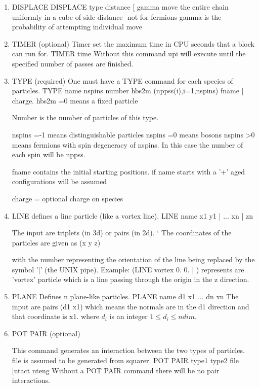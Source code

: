 \begin{enumerate}
\item DISPLACE
\bv
 DISPLACE  type distance [ gamma 
\ev
  move the entire chain uniformly in a cube
  of  side distance -not for fermions
  gamma is the probability of attempting individual  move
\item TIMER (optional)
Timer set the maximum time in CPU seconds that a block can run for.
\bv
TIMER  time
\ev
Without this command upi will execute until the specified number of
passes are finished.
         
\item TYPE (required)
One must have a TYPE command for each species of particles.
\bv
TYPE name nspins number hbs2m (nppss(i),i=1,nspins) fname [ charge.
\ev
     hbs2m =0 means a fixed particle

Number is the number of particles of this type.

     nspins =-1 means distinguishable particles
     nspins =0  means bosons
     nspins >0  means fermions with spin degeneracy of nspins.
     In this case the number of each spin will be nppss.

fname contains the initial starting positions.
if name starts with a '+' aged configurations will be assumed

     charge = optional charge on species
\item LINE
defines a line particle (like a vortex line). 
\bv
  LINE name x1 y1 | ...  xn | zn
\ev

The input are triplets (in 3d) or pairs (in 2d). `
The coordinates of the particles are given as (x y z)

with the number representing the orientation of the line 
being replaced by the symbol '|' (the UNIX pipe).
Example: (LINE vortex 0. 0. | ) represents are 'vortex' particle
which is a line passing through the origin in the z direction.

\item PLANE
Defines n plane-like particles.  
\bv
  PLANE name d1 x1 ... dn xn
\ev
The input are pairs (d1 x1) which means
the normals are in the d1 direction and
that coordinate is x1. where $d_i$ is an integer $1 \le d_i \le ndim$.

\item POT PAIR (optional)

This command generates an interaction between the two types of particles.
file is assumed to be generated from squarer.
\bv
POT PAIR type1 type2 file [ntact nteng
\ev
Without a POT PAIR command there will be no pair interactions.


\end{enumerate}
